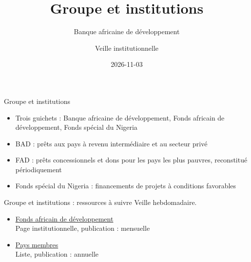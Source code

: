 \documentclass[aspectratio=169,11pt]{beamer}
\title{Groupe et institutions}
\subtitle{Banque africaine de développement}
\author{Veille institutionnelle}
\date{2026-11-03}
\begin{document}
\begin{frame}\titlepage\end{frame}

\begin{frame}{Groupe et institutions}
\begin{itemize}
\item Trois guichets : Banque africaine de développement, Fonds africain de développement, Fonds spécial du Nigeria
\item BAD : prêts aux pays à revenu intermédiaire et au secteur privé
\item FAD : prêts concessionnels et dons pour les pays les plus pauvres, reconstitué périodiquement
\item Fonds spécial du Nigeria : financements de projets à conditions favorables
\end{itemize}
\end{frame}

\begin{frame}{Groupe et institutions : ressources à suivre}
\small
Veille hebdomadaire.
\begin{itemize}
\item \href{https://www.afdb.org/en/about-us/african-development-fund}{Fonds africain de développement}\\{\footnotesize Page institutionnelle, publication : mensuelle}
\item \href{https://www.afdb.org/en/about-us/corporate-information/members}{Pays membres}\\{\footnotesize Liste, publication : annuelle}
\end{itemize}
\end{frame}
\end{document}
